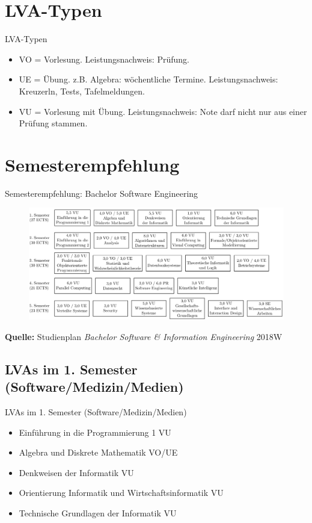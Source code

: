 \documentclass{beamer}
\begin{document}
\section{LVA-Typen}
\begin{frame}{LVA-Typen}
    \begin{itemize}
    \item VO = Vorlesung.
          Leistungsnachweis: Prüfung.
    \item UE = Übung.
          z.B. Algebra: wöchentliche Termine.
          Leistungsnachweis: Kreuzerln, Tests, Tafelmeldungen.
    \item VU = Vorlesung mit Übung.
          Leistungsnachweis: Note darf nicht nur aus einer Prüfung stammen.
    \end{itemize}
\end{frame}

\section{Semesterempfehlung}
\begin{frame}{Semesterempfehlung: Bachelor Software Engineering}
    \begin{figure}[htp]
        \centering
        \includegraphics[width=1\textwidth]{semesterempfehlung.png}
    \end{figure}
    \tiny \textbf{Quelle:} Studienplan \textit{Bachelor Software \&
        Information Engineering} 2018W
\end{frame}

\subsection{LVAs im 1. Semester (Software/Medizin/Medien)}
\begin{frame}{LVAs im 1. Semester (Software/Medizin/Medien)}
    \begin{itemize}
        \item Einführung in die Programmierung 1 VU
        \item Algebra und Diskrete Mathematik VO/UE
        \item Denkweisen der Informatik VU
        \item Orientierung Informatik und Wirtschaftsinformatik VU
        \item Technische Grundlagen der Informatik VU
    \end{itemize}
\end{frame}
\end{document}
